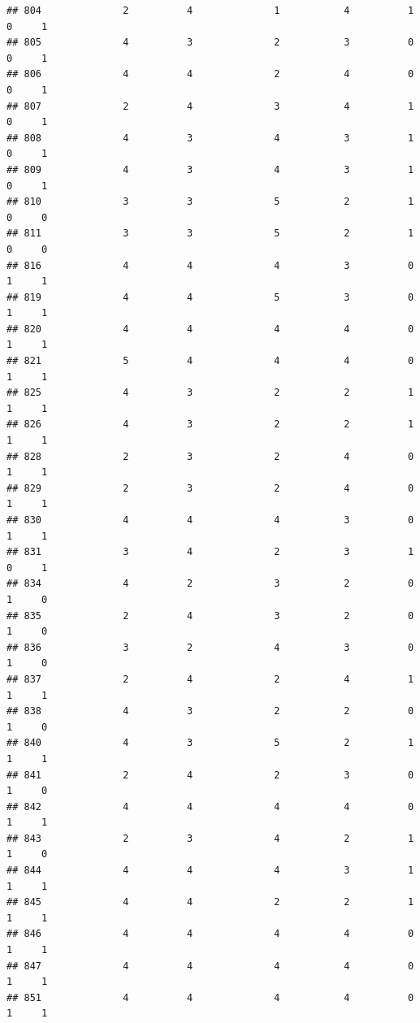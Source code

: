 \documentclass[
]{article}
\begin{document}
\begin{verbatim}
## 804              2          4              1           4          1    0     1
## 805              4          3              2           3          0    0     1
## 806              4          4              2           4          0    0     1
## 807              2          4              3           4          1    0     1
## 808              4          3              4           3          1    0     1
## 809              4          3              4           3          1    0     1
## 810              3          3              5           2          1    0     0
## 811              3          3              5           2          1    0     0
## 816              4          4              4           3          0    1     1
## 819              4          4              5           3          0    1     1
## 820              4          4              4           4          0    1     1
## 821              5          4              4           4          0    1     1
## 825              4          3              2           2          1    1     1
## 826              4          3              2           2          1    1     1
## 828              2          3              2           4          0    1     1
## 829              2          3              2           4          0    1     1
## 830              4          4              4           3          0    1     1
## 831              3          4              2           3          1    0     1
## 834              4          2              3           2          0    1     0
## 835              2          4              3           2          0    1     0
## 836              3          2              4           3          0    1     0
## 837              2          4              2           4          1    1     1
## 838              4          3              2           2          0    1     0
## 840              4          3              5           2          1    1     1
## 841              2          4              2           3          0    1     0
## 842              4          4              4           4          0    1     1
## 843              2          3              4           2          1    1     0
## 844              4          4              4           3          1    1     1
## 845              4          4              2           2          1    1     1
## 846              4          4              4           4          0    1     1
## 847              4          4              4           4          0    1     1
## 851              4          4              4           4          0    1     1

\end{verbatim}
\end{document}
